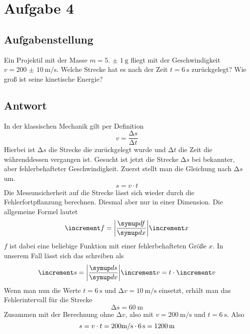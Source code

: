 \section{Aufgabe 4}

\subsection{Aufgabenstellung}
Ein Projektil mit der Masse $m = \SI{5.(1)}{\gram}$ fliegt mit der Geschwindigkeit \\
$v = \SI{200(10)}{\meter\per\second}$. Welche Strecke hat es nach der Zeit $t = \SI{6}{\second}$ zurückgelegt? Wie groß
ist seine kinetische Energie?

\subsection{Antwort}
In der klassischen Mechanik gilt per Definition
\begin{equation}
v = \frac{\increment s}{\increment t}
\end{equation}
Hierbei ist $\increment s$ die Strecke die zurückgelegt wurde und $\increment t$ die Zeit die währenddessen
vergangen ist. Gesucht ist jetzt die Strecke $\increment s$ bei bekannter, aber fehlerbehafteter Geschwindigkeit.
Zuerst stellt man die Gleichung nach $\increment s$ um.
\begin{equation}
s = v \cdot t
\end{equation}
Die Messunsicherheit auf die Strecke lässt sich wieder durch die Fehlerfortpflanzung berechnen. Diesmal aber
nur in einer Dimension. Die allgemeine Formel lautet
\begin{equation}
\increment f = \biggl| \frac{\dif{f}}{\dif{x}} \biggr| \increment x
\end{equation}
$f$ ist dabei eine beliebige Funktion mit einer fehlerbehafteten Größe $x$. In unserem Fall lässt sich
das schreiben als
\begin{equation}
\increment s = \biggl| \frac{\dif{s}}{\dif{v}} \biggr| \increment v = t \cdot \increment v 
\end{equation}
Wenn man nun die Werte $t = \SI{6}{\second}$ und $\increment v = \SI{10}{\meter\per\second}$ einsetzt, erhält man das Fehlerintervall für die Strecke
\begin{equation}
\increment s = \SI{60}{\meter}
\end{equation}
Zusammen mit der Berechnung ohne $\increment v$, also mit $v = \SI{200}{\meter\per\second}$ und $t = \SI{6}{\second}$. Also
\begin{equation}
s = v \cdot t = 200 \si[per-mode=symbol]{\meter\per\second} \cdot \SI{6}{\second} = \SI{1200}{\meter}
\end{equation}
